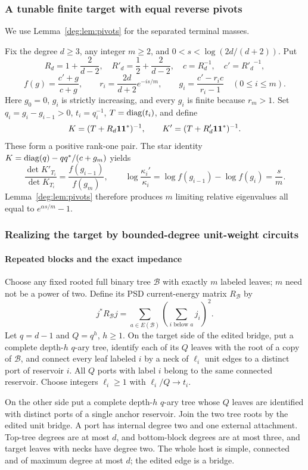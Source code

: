 \subsubsection{A tunable finite target with equal reverse pivots}
We use Lemma~\ref{deg:lem:pivots} for the separated terminal masses.

Fix the degree $d\ge3$, any integer $m\ge2$, and
$0<s<\log(2d/(d+2))$. Put
\[
 R_d=1+\frac2{d-2},\quad R'_d=\frac12+\frac2{d-2},\quad
 c=R_d^{-1},\quad c'={R'_d}^{-1},
\]
\[
 f(g)=\frac{c'+g}{c+g},\qquad r_i=\frac{2d}{d+2}e^{-is/m},\qquad
 g_i=\frac{c'-r_ic}{r_i-1}\quad(0\le i\le m).
\]
Here $g_0=0$, $g_i$ is strictly increasing, and every $g_i$ is finite
because $r_m>1$. Set $q_i=g_i-g_{i-1}>0$, $t_i=q_i^{-1}$,
$T=\operatorname{diag}(t_i)$, and define
\begin{equation}\label{sharp:eq:target}
 K=(T+R_d\boldsymbol 1\boldsymbol 1^*)^{-1},\qquad
 K'=(T+R'_d\boldsymbol 1\boldsymbol 1^*)^{-1}.
\end{equation}
These form a positive rank-one pair. The star identity
$K=\operatorname{diag}(q)-qq^*/(c+g_m)$ yields
\[
 \frac{\det K'_{T_i}}{\det K_{T_i}}
         =\frac{f(g_{i-1})}{f(g_m)},\qquad
 \log\frac{\kappa_i'}{\kappa_i}
         =\log f(g_{i-1})-\log f(g_i)=\frac{s}{m}.
\]
Lemma~\ref{deg:lem:pivots} therefore produces $m$ limiting relative
eigenvalues all equal to $e^{\alpha s/m}-1$.

\subsubsection{Realizing the target by bounded-degree unit-weight circuits}
\paragraph{Repeated blocks and the exact impedance}
Choose any fixed rooted full binary tree $\mathcal B$ with exactly
$m$ labeled leaves; $m$ need not be a power of two. Define its PSD
current-energy matrix $R_{\mathcal B}$ by
\[
 j^*R_{\mathcal B}j
   =\sum_{a\in E(\mathcal B)}\left(\sum_{i\text{ below }a}j_i\right)^2.
\]
Let $q=d-1$ and $Q=q^h$, $h\ge1$. On the target side of the edited bridge, put
a complete depth-$h$ $q$-ary tree, identify each of its $Q$ leaves with
the root of a copy of $\mathcal B$, and connect every leaf labeled $i$
by a neck of $\ell_i$ unit edges to a distinct port of reservoir $i$.
All $Q$ ports with label $i$ belong to the same connected reservoir.
Choose integers $\ell_i\ge1$ with $\ell_i/Q\to t_i$.

On the other side put a complete depth-$h$ $q$-ary tree whose $Q$ leaves
are identified with distinct ports of a single anchor reservoir.
Join the two tree roots by the edited unit bridge. A port has internal
degree two and one external attachment. Top-tree degrees are at most $d$,
and bottom-block degrees are at most three,
and target leaves with necks have degree two. The whole host is simple,
connected and of maximum degree at most $d$; the edited edge is a bridge.

